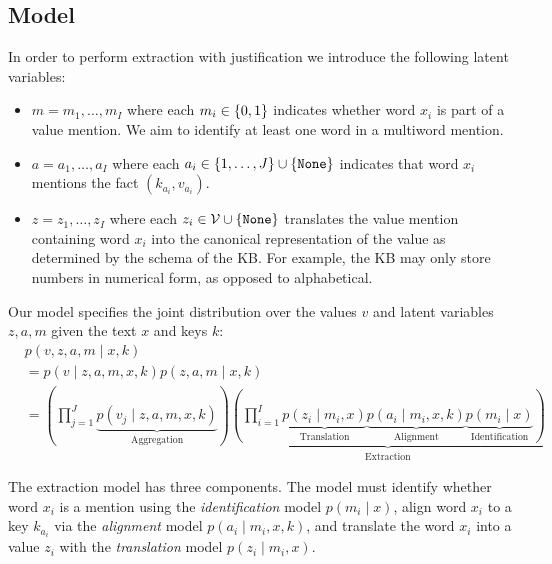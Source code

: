 \documentclass[12pt]{article}
\begin{document}
\subsection{Model}
In order to perform extraction with justification we
introduce the following latent variables:
\begin{itemize}
\item $m = m_1, \ldots, m_I$ where each $m_i \in \left\{0,1\right\}$
    indicates whether word $x_i$ is part of a value mention.
    We aim to identify at least one word in a multiword mention.
\item $a = a_1, \ldots, a_I$ where each
    $a_i \in \left\{1, \ldots, J\right\} \cup \left\{\texttt{None}\right\}$
    indicates that word $x_i$ mentions the fact $(k_{a_i}, v_{a_i})$.
\item $z = z_1, \ldots, z_I$ where each $z_i \in \mathcal{V}\cup \left\{\texttt{None}\right\}$
    translates the value mention containing word $x_i$
    into the canonical representation of
    the value as determined by the schema of the KB.
    For example, the KB may only store numbers in numerical form,
    as opposed to alphabetical.
\end{itemize}

Our model specifies the joint distribution over the values $v$ and latent variables $z,a,m$
given the text $x$ and keys $k$:
\begin{equation}
\label{eqn:prob}
\begin{aligned}
&p(v,z,a,m\mid x,k)\\
&= p(v\mid z,a,m,x,k)p(z,a,m\mid x,k)\\
&= \left(\prod_{j=1}^J \underbrace{p(v_j\mid z,a,m,x,k)}_{\textrm{Aggregation}}\right)
    \underbrace{\left(\prod_{i=1}^I
        \underbrace{p(z_i\mid m_i,x)}_{\textrm{Translation}}
        \underbrace{p(a_i\mid m_i,x,k)}_{\textrm{Alignment}}
        \underbrace{p(m_i\mid x)}_{\textrm{Identification}}
    \right)}_{\textrm{Extraction}}
\end{aligned}
\end{equation}

The extraction model has three components.
The model must identify whether word $x_i$
is a mention using the \textit{identification} model $p(m_i \mid x)$,
align word $x_i$ to a key $k_{a_i}$ via the \textit{alignment} model $p(a_i \mid m_i, x, k)$,
and translate the word $x_i$ into a value $z_i$ with the
\textit{translation} model $p(z_i \mid m_i, x)$.
\end{document}
